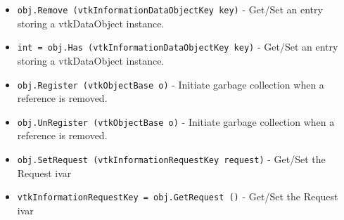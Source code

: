 \begin{itemize}
\item  \verb|obj.Remove (vtkInformationDataObjectKey key)| -  Get/Set an entry storing a vtkDataObject instance.

\item  \verb|int = obj.Has (vtkInformationDataObjectKey key)| -  Get/Set an entry storing a vtkDataObject instance.

\item  \verb|obj.Register (vtkObjectBase o)| -  Initiate garbage collection when a reference is removed.

\item  \verb|obj.UnRegister (vtkObjectBase o)| -  Initiate garbage collection when a reference is removed.

\item  \verb|obj.SetRequest (vtkInformationRequestKey request)| -  Get/Set the Request ivar

\item  \verb|vtkInformationRequestKey = obj.GetRequest ()| -  Get/Set the Request ivar

\end{itemize}
